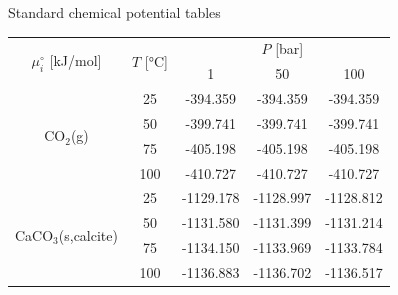 \begin{frame}[allowframebreaks]{Standard chemical potential tables}
\begin{center}
{\footnotesize{}}%
\begin{tabular*}{1\columnwidth}{@{\extracolsep{\fill}}ccccc}
\toprule 
\multirow{2}{*}{$\mu_{i}^{\circ}$ {[}kJ/mol{]}} & \multirow{2}{*}{{\footnotesize{}$T$ {[}°C{]}}} & \multicolumn{3}{c}{{\footnotesize{}$P$ {[}bar{]}}}\tabularnewline
\cmidrule{3-5} \cmidrule{4-5} \cmidrule{5-5} 
 &  & {\footnotesize{}1} & {\footnotesize{}50} & {\footnotesize{}100}\tabularnewline
\midrule
\multirow{4}{*}{{\footnotesize{}CO$_{2}$(g)}} & {\footnotesize{}25} & {\footnotesize{}-394.359} & {\footnotesize{}-394.359} & {\footnotesize{}-394.359}\tabularnewline
 & {\footnotesize{}50} & {\footnotesize{}-399.741} & {\footnotesize{}-399.741} & {\footnotesize{}-399.741}\tabularnewline
 & {\footnotesize{}75} & {\footnotesize{}-405.198} & {\footnotesize{}-405.198} & {\footnotesize{}-405.198}\tabularnewline
 & {\footnotesize{}100} & {\footnotesize{}-410.727} & {\footnotesize{}-410.727} & {\footnotesize{}-410.727}\tabularnewline
\midrule 
\multirow{4}{*}{{\footnotesize{}CaCO$_{3}$(s,calcite)}} & {\footnotesize{}25} & {\footnotesize{}-1129.178} & {\footnotesize{}-1128.997} & {\footnotesize{}-1128.812}\tabularnewline
 & {\footnotesize{}50} & {\footnotesize{}-1131.580} & {\footnotesize{}-1131.399} & {\footnotesize{}-1131.214}\tabularnewline
 & {\footnotesize{}75} & {\footnotesize{}-1134.150} & {\footnotesize{}-1133.969} & {\footnotesize{}-1133.784}\tabularnewline
 & {\footnotesize{}100} & {\footnotesize{}-1136.883} & {\footnotesize{}-1136.702} & {\footnotesize{}-1136.517}\tabularnewline
\bottomrule
\end{tabular*}{\footnotesize\par}
\par\end{center}

\end{frame}
%
